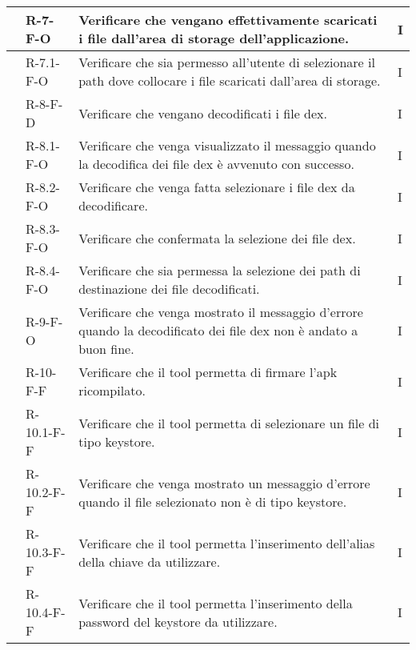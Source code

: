 \begin{longtable}{ | C{2.5cm} |C{2cm} |C{7cm} |C{1.5cm}|}
     & R-7-F-O    & Verificare che vengano effettivamente scaricati i file dall'area di storage dell'applicazione.& I \\\hline
     & R-7.1-F-O  & Verificare che sia permesso all'utente di selezionare il path dove collocare i file scaricati dall'area di storage.& I \\\hline
     & R-8-F-D    & Verificare che vengano decodificati i file dex.& I \\\hline
     & R-8.1-F-O  & Verificare che venga visualizzato il messaggio quando la decodifica dei file dex è avvenuto con successo.& I \\\hline
     & R-8.2-F-O  & Verificare che venga fatta selezionare i file dex da decodificare.& I \\\hline
     & R-8.3-F-O  & Verificare che confermata la selezione dei file dex.& I \\\hline
     & R-8.4-F-O  & Verificare che sia permessa la selezione dei path di destinazione dei file decodificati.& I \\\hline
     & R-9-F-O    & Verificare che venga mostrato il messaggio d'errore quando la decodificato dei file dex non è andato a buon fine.& I \\\hline
     & R-10-F-F   & Verificare che il tool permetta di firmare l'apk ricompilato.& I \\\hline
     & R-10.1-F-F & Verificare che il tool permetta di selezionare un file di tipo keystore.& I \\\hline
     & R-10.2-F-F & Verificare che venga mostrato un messaggio d'errore quando il file selezionato non è di tipo keystore.& I \\\hline
     & R-10.3-F-F & Verificare che il tool permetta l'inserimento dell'alias della chiave da utilizzare.& I \\\hline
     & R-10.4-F-F & Verificare che il tool permetta l'inserimento della password del keystore da utilizzare.& I \\\hline


\end{longtable}
